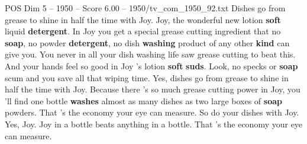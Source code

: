 \begin{textsample}{POS Dim 5 – 1950 – Score 6.00 – 1950/tv\_com\_1950\_92.txt}  \label{ex:f5_pos_043}
Dishes go from grease to shine in half the time with Joy.
Joy, the wonderful new lotion \textbf{soft} liquid \textbf{detergent}.
In Joy you get a special grease cutting ingredient that no \textbf{soap}, no powder \textbf{detergent}, no dish \textbf{washing} product of any other \textbf{kind} can give you.
You never in all your dish washing life saw grease cutting to beat this.
And your hands feel so good in Joy 's lotion \textbf{soft} \textbf{suds}.
Look, no specks or \textbf{soap} scum and you save all that wiping time.
Yes, dishes go from grease to shine in half the time with Joy.
Because there 's so much grease cutting power in Joy, you 'll find one bottle \textbf{washes} almost as many dishes as two large boxes of \textbf{soap} powders.
That 's the economy your eye can measure.
So do your dishes with Joy.
Yes, Joy.
Joy in a bottle beats anything in a bottle.
That 's the economy your eye can measure.

\end{textsample}
